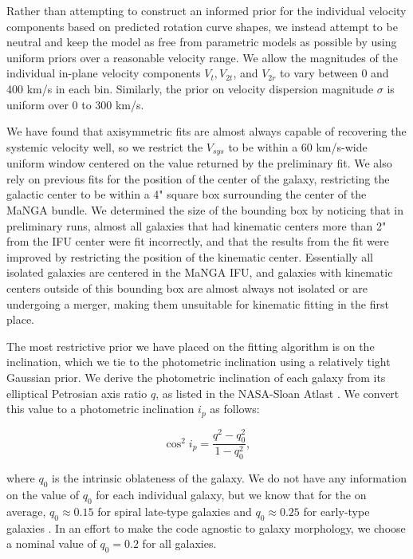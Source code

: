 Rather than attempting to construct an informed prior for the individual velocity components based on predicted rotation curve shapes, we instead attempt to be neutral and keep the model as free from parametric models as possible by using uniform priors over a reasonable velocity range. We allow the magnitudes of the individual in-plane velocity components $V_t, V_{2t}$, and $V_{2r}$ to vary between 0 and 400 km/s in each bin. Similarly, the prior on velocity dispersion magnitude $\sigma$ is uniform over 0 to 300 km/s.

We have found that axisymmetric fits are almost always capable of recovering the systemic velocity  well, so we restrict the $V_{sys}$ to be within a 60 km/s-wide uniform window centered on the value returned by the preliminary fit. We also rely on previous fits for the position of the center of the galaxy, restricting the galactic center to be within a 4" square box surrounding the center of the MaNGA bundle. We determined the size of the bounding box by noticing that in preliminary runs, almost all galaxies that had kinematic centers more than 2" from the IFU center were fit incorrectly, and that the results from the fit were improved by restricting the position of the kinematic center. Essentially all isolated galaxies are centered in the MaNGA IFU,  and galaxies with kinematic centers outside of this bounding box are almost always not isolated or are undergoing a merger, making them unsuitable for kinematic fitting in the first place. 

The most restrictive prior we have placed on the fitting algorithm is on the inclination, which we tie to the photometric inclination using a relatively tight Gaussian prior. We derive the photometric inclination of each galaxy from its elliptical Petrosian axis ratio $q$, as listed in the NASA-Sloan Atlast \citep{blanton11}. We convert this value to a photometric inclination $i_p$ as follows:

\begin{equation}
    \cos ^2 i_p = \frac{q^2 - q_0^2}{1 - q_0^2},
\end{equation}

\noindent where $q_0$ is the intrinsic oblateness of the galaxy. We do not have any information on the value of $q_0$ for each individual galaxy, but we know that for the on average, $q_0 \approx 0.15$ for spiral late-type galaxies and $q_0 \approx 0.25$ for early-type galaxies . In an effort to make the code agnostic to galaxy morphology, we choose a nominal value of $q_0 = 0.2$ for all galaxies. 

